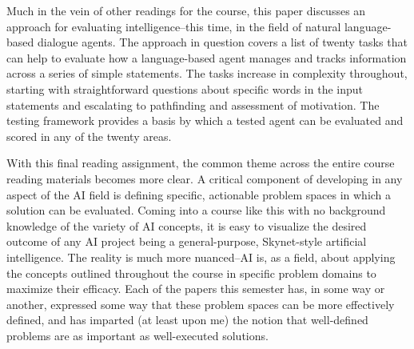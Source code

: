 \documentclass{article}
\begin{document}
  
  \graphicspath{{./images/}}
\par Much in the vein of other readings for the course, this paper discusses an approach for evaluating intelligence--this time, in the field of natural language-based dialogue agents.
The approach in question covers a list of twenty tasks that can help to evaluate how a language-based agent manages and tracks information across a series of simple statements.
The tasks increase in complexity throughout, starting with straightforward questions about specific words in the input statements and escalating to pathfinding and assessment of motivation.
The testing framework provides a basis by which a tested agent can be evaluated and scored in any of the twenty areas.

\par With this final reading assignment, the common theme across the entire course reading materials becomes more clear.
A critical component of developing in any aspect of the AI field is defining specific, actionable problem spaces in which a solution can be evaluated.
Coming into a course like this with no background knowledge of the variety of AI concepts, it is easy to visualize the desired outcome of any AI project being a general-purpose, Skynet-style artificial intelligence.
The reality is much more nuanced--AI is, as a field, about applying the concepts outlined throughout the course in specific problem domains to maximize their efficacy.
Each of the papers this semester has, in some way or another, expressed some way that these problem spaces can be more effectively defined, and has imparted (at least upon me) the notion that well-defined problems are as important as well-executed solutions.
\end{document}
